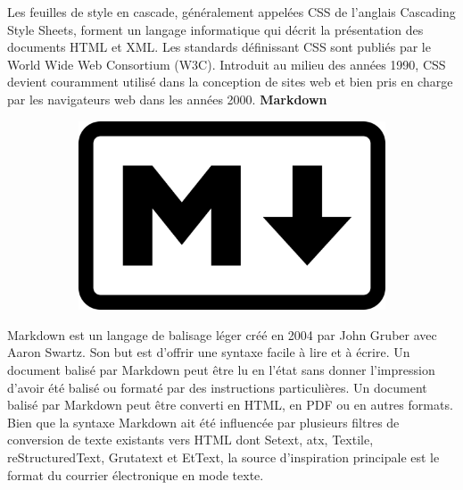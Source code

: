 \documentclass{article}
\begin{document}
Les feuilles de style en cascade, généralement appelées CSS de l'anglais Cascading Style Sheets, forment un langage informatique qui décrit la présentation des documents HTML et XML. Les standards définissant CSS sont publiés par le World Wide Web Consortium (W3C). Introduit au milieu des années 1990, CSS devient couramment utilisé dans la conception de sites web et bien pris en charge par les navigateurs web dans les années 2000.
\newline
\textbf{Markdown}
\newline
\begin{figure}[h!]
	\centering
  	\begin{subfigure}[b]{0.25\linewidth}
	\includegraphics[width=\linewidth]{mark.png}
  	\end{subfigure}
\end{figure}

Markdown est un langage de balisage léger créé en 2004 par John Gruber avec Aaron Swartz. Son but est d'offrir une syntaxe facile à lire et à écrire. Un document balisé par Markdown peut être lu en l'état sans donner l’impression d'avoir été balisé ou formaté par des instructions particulières.
\newline
Un document balisé par Markdown peut être converti en HTML, en PDF ou en autres formats. Bien que la syntaxe Markdown ait été influencée par plusieurs filtres de conversion de texte existants vers HTML dont Setext, atx, Textile, reStructuredText, Grutatext et EtText, la source d’inspiration principale est le format du courrier électronique en mode texte. 
\newline
\end{document}
